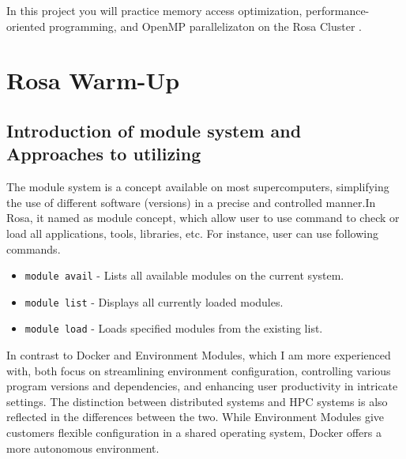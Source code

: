 \documentclass[unicode,11pt,a4paper,oneside,numbers=endperiod,openany]{scrartcl}
\begin{document}
\setassignment

\newline

\assignmentpolicy
In this project you will practice memory access optimization, performance-oriented programming, and OpenMP parallelizaton 
on the Rosa Cluster .  

\section{Rosa Warm-Up }
\subsection{Introduction of module system and Approaches to utilizing}
The module system is a concept available on most supercomputers, simplifying the use of different software (versions) in a precise and controlled manner\cite{wikiModules}.In Rosa, it named as module concept, which allow user to use command to check or load all applications, tools, libraries, etc. For instance, user can use following commands\cite{ComputeResources}.
\begin{itemize}[noitemsep, topsep=0pt]
    \item \texttt{module avail} - Lists all available modules on the current system.
    \item \texttt{module list} - Displays all currently loaded modules.
    \item \texttt{module load} - Loads specified modules from the existing list.
\end{itemize}
In contrast to Docker and Environment Modules, which I am more experienced with, both focus on streamlining environment configuration, controlling various program versions and dependencies, and enhancing user productivity in intricate settings. The distinction between distributed systems and HPC systems is also reflected in the differences between the two. While Environment Modules give customers flexible configuration in a shared operating system, Docker offers a more autonomous environment.
\end{document}
